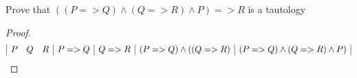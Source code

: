 \documentclass[12pt]{article}
\newenvironment{statement}[2][]{\begin{trivlist}
\item[\hskip \labelsep {\bfseries #1}\hskip \labelsep {\bfseries #2.}]}{\end{trivlist}}
\begin{document}
 

\begin{statement}{Excercise 3}
Prove that $((P=>Q) \land (Q=>R) \land P) => R $ is a tautology
\begin{proof}
\begin{displaymath}
\begin{array}{|c c c|c|c|c|c|}
  P & Q & R & P=>Q& Q=>R & (P=>Q) \land ((Q=>R) & (P=>Q) \land (Q=>R) \land P) 





\end{array}
\end{displaymath}


\end{proof}

\end{statement}
 








 
\end{document}
